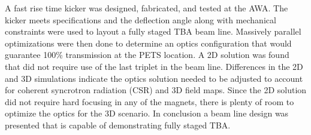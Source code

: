 A fast rise time kicker was designed, fabricated, and tested 
at the AWA. 
The kicker meets specifications and the deflection angle 
along with mechanical constraints were used to layout 
a fully staged TBA beam line. 
Massively parallel optimizations were then done to 
determine an optics configuration that would guarantee 
100\% transmission at the PETS location. 
A 2D solution was found that did not require use of the
last triplet in the beam  line. 
Differences in the 2D and 3D simulations indicate the optics 
solution needed to be adjusted to account for coherent syncrotron radiation (CSR) and 3D field maps. 
Since the 2D solution did not require hard focusing in any of the magnets, 
there is plenty of room to optimize the optics for the 3D scenario.
In conclusion a beam line design was presented that is capable of 
demonstrating fully staged TBA. 










